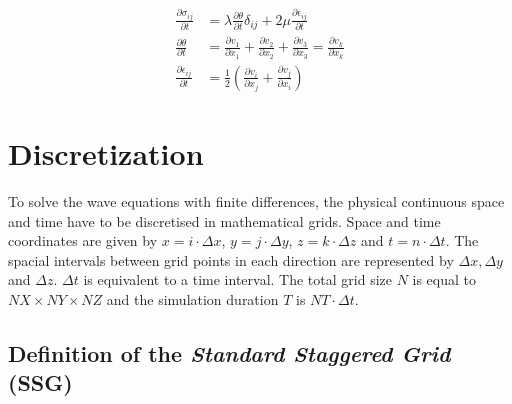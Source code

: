 \documentclass[pdftex,a4paper,parskip,listof=totoc,bibliography=totoc,onehalfspacing,12pt]{scrreprt}
\begin{document}
\begin{align}
	\frac{\partial\sigma_{ij}}{\partial t} &= \lambda \frac{\partial \theta}{\partial t} \delta_{ij} + 2 \mu \frac{\partial \epsilon_{ij}}{\partial t}\label{eqn:GenHookdt}\\
	\frac{\partial \theta}{\partial t} &= \frac{\partial v_1}{\partial x_1} + \frac{\partial v_2}{\partial x_2} + \frac{\partial v_3}{\partial x_3} = \frac{\partial v_k}{\partial x_k} \\
	\frac{\partial\epsilon_{ij}}{\partial t} &= \frac{1}{2} \left( \frac{\partial v_i}{\partial x_j} + \frac{\partial v_j}{\partial x_i} \right)\label{eqn:Dehnijdt}
\end{align}
\cleardoublepage

\chapter{Discretization}

To solve the wave equations with finite differences, the physical continuous space and time have to be discretised in mathematical grids. Space and time coordinates are given by $x=i \cdot \Delta x$, $y=j \cdot \Delta y$, $z=k \cdot \Delta z$ and $t=n \cdot \Delta t$. The spacial intervals between grid points in each direction are represented by $\Delta x, \Delta y$ and $\Delta z$. $\Delta t$ is equivalent to a time interval. The total grid size $N$ is equal to $NX \times NY \times NZ$ and the simulation duration $T$ is $NT \cdot \Delta t$.

\section{Definition of the \textit{Standard Staggered Grid} (SSG)} \label{sec:SSG}
\end{document}
